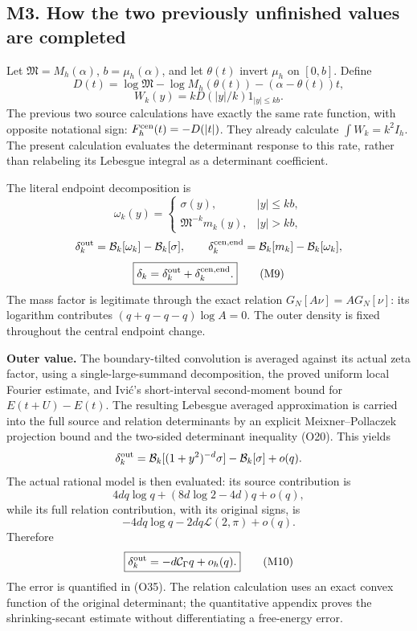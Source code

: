 \documentclass[
  11pt,
]{article}
\begin{document}
\subsection{M3. How the two previously unfinished values are
completed}\label{m3.-how-the-two-previously-unfinished-values-are-completed}

Let \(\mathfrak M=M_h(\alpha)\), \(b=\mu_h(\alpha)\), and let
\(\theta(t)\) invert \(\mu_h\) on \([0,b]\). Define \[
D(t)=\log\mathfrak M-\log M_h(\theta(t))-(\alpha-\theta(t))t,
\] \[
W_k(y)=kD(|y|/k)1_{|y|\le kb}.
\] The previous two source calculations have exactly the same rate
function, with opposite notational sign: \(F_h^{\rm cen}(t)=-D(|t|)\).
They already calculate \(\int W_k=k^2I_h\). The present calculation
evaluates the determinant response to this rate, rather than relabeling
its Lebesgue integral as a determinant coefficient.

The literal endpoint decomposition is \[
\omega_k(y)=
\begin{cases}\sigma(y),&|y|\le kb,\\
\mathfrak M^{-k}m_k(y),&|y|>kb,
\end{cases}
\] \[
\delta_k^{\rm out}=\mathcal B_k[\omega_k]-\mathcal B_k[\sigma],\qquad
\delta_k^{\rm cen,end}=\mathcal B_k[m_k]-\mathcal B_k[\omega_k],
\] \[
\boxed{\delta_k=\delta_k^{\rm out}+\delta_k^{\rm cen,end}.}\tag{M9}
\] The mass factor is legitimate through the exact relation
\(G_N[A\nu]=AG_N[\nu]\): its logarithm contributes
\((q+q-q-q)\log A=0\). The outer density is fixed throughout the central
endpoint change.

\textbf{Outer value.} The boundary-tilted convolution is averaged
against its actual zeta factor, using a single-large-summand
decomposition, the proved uniform local Fourier estimate, and Ivić's
short-interval second-moment bound for \(E(t+U)-E(t)\). The resulting
Lebesgue averaged approximation is carried into the full source and
relation determinants by an explicit Meixner--Pollaczek projection bound
and the two-sided determinant inequality (O20). This yields \[
\delta_k^{\rm out}
=\mathcal B_k[(1+y^2)^{-d}\sigma]-\mathcal B_k[\sigma]+o(q).
\] The actual rational model is then evaluated: its source contribution
is \[
4dq\log q+(8d\log2-4d)q+o(q),
\] while its full relation contribution, with its original signs, is \[
-4dq\log q-2dq\mathcal L(2,\pi)+o(q).
\] Therefore \[
\boxed{\delta_k^{\rm out}=-d\mathcal C_\Gamma q+o_h(q).}\tag{M10}
\] The error is quantified in (O35). The relation calculation uses an
exact convex function of the original determinant; the quantitative
appendix proves the shrinking-secant estimate without differentiating a
free-energy error.
\end{document}
